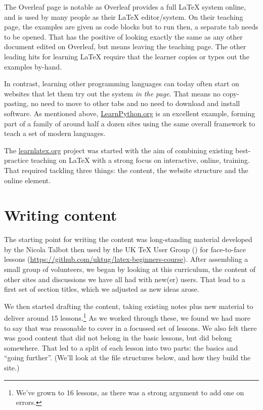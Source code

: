 \documentclass[harvardcite]{ltugboat}
\begin{document}
The Overleaf page is notable as Overleaf provides a full \LaTeX{} system
online, and is used by many people as their \LaTeX{} editor/system. On their
teaching page, the examples are given as code blocks but to run then, a
separate tab needs to be opened. That has the positive of looking exactly the
same as any other document edited on Overleaf, but means leaving the teaching
page. The other leading hits for learning \LaTeX{} require that the learner
copies or types out the examples by-hand.

In contrast, learning other programming languages can today often start on
websites that let them try out the system \emph{in the page}. That means
no copy-pasting, no need to move to other tabs and no need to download and
install software. As mentioned above, \url{LearnPython.org} is an excellent
example, forming part of a family of around half a dozen sites using the
same overall framework to teach a set of modern languages.

The \url{learnlatex.org} project was started with the aim of combining existing
best-practice teaching on \LaTeX{} with a strong focus on interactive, online,
training. That required tackling three things: the content, the website
structure and the online element.

\section{Writing content}

The starting point for writing the content was long-standing material developed
by the Nicola Talbot then used by the UK \TeX{} User Group () for
face-to-face lessons (\url{https://github.com/uktug/latex-beginners-course}). After 
assembling a small group of volunteers, we began by looking at this curriculum,
the content of other sites and discussions we have all had with new(er) users.
That lead to a first set of section titles, which we adjusted as new ideas
arose.

We then started drafting the content, taking existing notes plus new material
to deliver around 15 lessons.\footnote{We've grown to 16 lessons, as there was
a strong argument to add one on errors.} As we worked through these, we found
we had more to say that was reasonable to cover in a focussed set of lessons.
We also felt there was good content that did not belong in the basic lessons,
but did belong somewhere. That led to a split of each lesson into two parts:
the basics and \enquote{going further}. (We'll look at the file structures
below, and how they build the site.)
\end{document}
